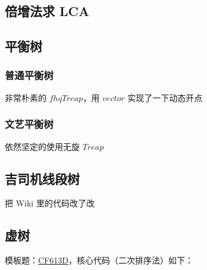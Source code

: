 \documentclass[12pt]{article}
\begin{document}


\newpage

\subsection{倍增法求 LCA}



\newpage

\subsection{平衡树}

\subsubsection{普通平衡树}

非常朴素的 $fhqTreap$，用 $vector$ 实现了一下动态开点



\newpage

\subsubsection{文艺平衡树}

依然坚定的使用无旋 $Treap$



\newpage

\subsection{吉司机线段树}

把 Wiki 里的代码改了改



\newpage

\subsection{虚树}

模板题：\href{https://codeforces.com/problemset/problem/613/D}{CF613D}，核心代码（二次排序法）如下：


\end{document}
